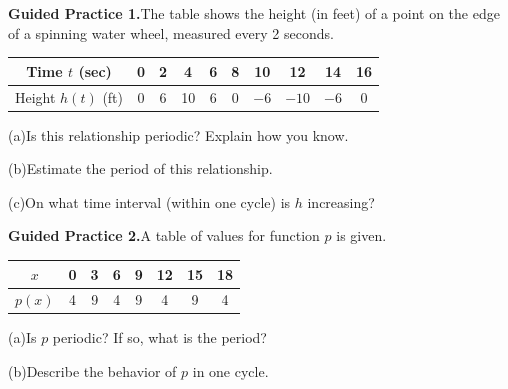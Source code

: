 \documentclass[10pt]{article}
\begin{document}
\begin{practicebox}

\textbf{Guided Practice 1.}\quad The table shows the height (in feet) of a
point on the edge of a spinning water wheel, measured every 2 seconds.

\vspace{4pt}
\begin{center}
\renewcommand{\arraystretch}{1.35}
\begin{tabular}{|c|c|c|c|c|c|c|c|c|c|}
\hline
Time $t$ (sec) & 0 & 2 & 4 & 6 & 8 & 10 & 12 & 14 & 16 \\
\hline
Height $h(t)$ (ft) & 0 & 6 & 10 & 6 & 0 & $-6$ & $-10$ & $-6$ & 0 \\
\hline
\end{tabular}
\end{center}

\vspace{4pt}
(a)\quad Is this relationship periodic? Explain how you know.

(b)\quad Estimate the period of this relationship.

(c)\quad On what time interval (within one cycle) is $h$ increasing?

\vspace{0.10in}
\textbf{Guided Practice 2.}\quad A table of values for function $p$ is given.

\begin{center}
\renewcommand{\arraystretch}{1.35}
\begin{tabular}{|c|c|c|c|c|c|c|c|}
\hline
$x$ & 0 & 3 & 6 & 9 & 12 & 15 & 18 \\
\hline
$p(x)$ & 4 & 9 & 4 & 9 & 4 & 9 & 4 \\
\hline
\end{tabular}
\end{center}

(a)\quad Is $p$ periodic? If so, what is the period?

(b)\quad Describe the behavior of $p$ in one cycle.

\end{practicebox}
\end{document}
